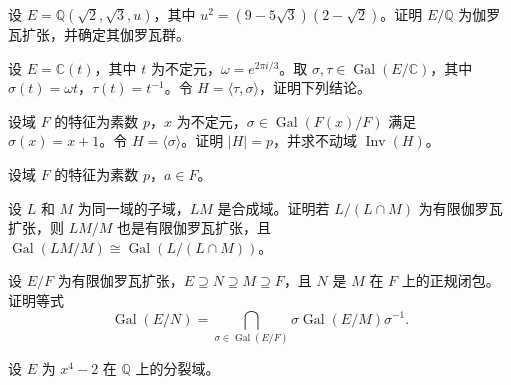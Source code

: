 \newpage
\noindent\begin{minipage}{\textwidth}
设 $E=\mathbb Q(\sqrt2,\sqrt3,u)$，其中 $u^2=(9-5\sqrt3)(2-\sqrt2)$。证明 $E/\mathbb Q$ 为伽罗瓦扩张，并确定其伽罗瓦群。
\end{minipage}\par\vfill
\noindent\begin{minipage}{\textwidth}
设 $E=\mathbb C(t)$，其中 $t$ 为不定元，$\omega=e^{2\pi i/3}$。取 $\sigma,\tau\in\operatorname{Gal}(E/\mathbb C)$，其中 $\sigma(t)=\omega t$，$\tau(t)=t^{-1}$。令 $H=\langle\tau,\sigma\rangle$，证明下列结论。
\end{minipage}\par\vfill
\noindent\begin{minipage}{\textwidth}
设域 $F$ 的特征为素数 $p$，$x$ 为不定元，$\sigma\in\operatorname{Gal}(F(x)/F)$ 满足 $\sigma(x)=x+1$。令 $H=\langle\sigma\rangle$。证明 $|H|=p$，并求不动域 $\operatorname{Inv}(H)$。
\end{minipage}\par\vfill
\newpage
\noindent\begin{minipage}{\textwidth}
设域 $F$ 的特征为素数 $p$，$a\in F$。
\end{minipage}\par\vfill
\noindent\begin{minipage}{\textwidth}
设 $L$ 和 $M$ 为同一域的子域，$LM$ 是合成域。证明若 $L/(L\cap M)$ 为有限伽罗瓦扩张，则 $LM/M$ 也是有限伽罗瓦扩张，且 $\operatorname{Gal}(LM/M)\cong\operatorname{Gal}(L/(L\cap M))$。
\end{minipage}\par\vfill
\noindent\begin{minipage}{\textwidth}
设 $E/F$ 为有限伽罗瓦扩张，$E\supseteq N\supseteq M\supseteq F$，且 $N$ 是 $M$ 在 $F$ 上的正规闭包。证明等式 \[\operatorname{Gal}(E/N)=\bigcap_{\sigma\in\operatorname{Gal}(E/F)}\sigma\operatorname{Gal}(E/M)\sigma^{-1}.\]
\end{minipage}\par\vfill
\newpage
\noindent\begin{minipage}{\textwidth}
设 $E$ 为 $x^4-2$ 在 $\mathbb Q$ 上的分裂域。
\end{minipage}\par\vfill

